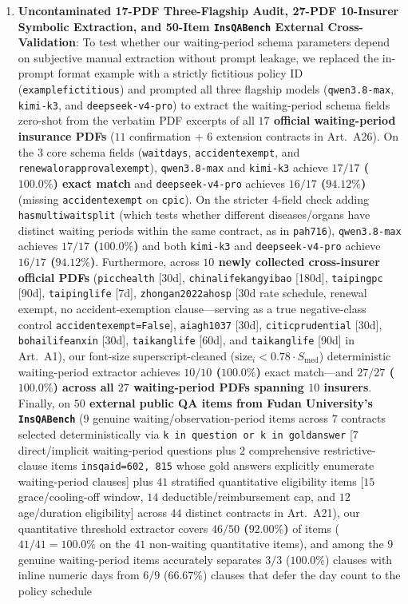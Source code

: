 \documentclass[10pt,twocolumn]{article}
\renewcommand{\_}{\textunderscore\allowbreak}
\begin{document}
\begin{enumerate}[leftmargin=*,nosep]
  \item \textbf{Uncontaminated 17-PDF Three-Flagship Audit, 27-PDF 10-Insurer Symbolic Extraction, and 50-Item \texttt{InsQABench} External Cross-Validation}: To test whether our waiting-period schema parameters depend on subjective manual extraction without prompt leakage, we replaced the in-prompt format example with a strictly fictitious policy ID (\texttt{example\_fictitious\_000}) and prompted all three flagship models (\texttt{qwen3.8-max}, \texttt{kimi-k3}, and \texttt{deepseek-v4-pro}) to extract the waiting-period schema fields zero-shot from the verbatim PDF excerpts of all \textbf{$17$ official waiting-period insurance PDFs} ($11$ confirmation + $6$ extension contracts in Art.~A26). On the 3 core schema fields (\texttt{wait\_days}, \texttt{accident\_exempt}, and \texttt{renewal\_or\_approval\_exempt}), \texttt{qwen3.8-max} and \texttt{kimi-k3} achieve \textbf{$17/17$ ($100.0\%$) exact match} and \texttt{deepseek-v4-pro} achieves \textbf{$16/17$ ($94.12\%$)} (missing \texttt{accident\_exempt} on \texttt{cpic\_85050}). On the stricter 4-field check adding \texttt{has\_multi\_wait\_split} (which tests whether different diseases/organs have distinct waiting periods within the same contract, as in \texttt{pa\_h716}), \texttt{qwen3.8-max} achieves \textbf{$17/17$ ($100.0\%$)} and both \texttt{kimi-k3} and \texttt{deepseek-v4-pro} achieve \textbf{$16/17$ ($94.12\%$)}. Furthermore, across \textbf{$10$ newly collected cross-insurer official PDFs} (\texttt{picc\_health\_9100015834} [30d], \texttt{chinalife\_kangyibao} [180d], \texttt{taiping\_pc\_202608} [90d], \texttt{taiping\_life\_202411} [7d], \texttt{zhongan\_2022a\_hosp} [30d rate schedule, renewal exempt, no accident-exemption clause---serving as a true negative-class control \texttt{accident\_exempt=False}], \texttt{aia\_gh1037\_01} [30d], \texttt{citic\_prudential\_016} [30d], \texttt{bohai\_life\_anxin} [30d], \texttt{taikang\_life\_202601} [60d], and \texttt{taikang\_life\_2021\_037} [90d] in Art.~A1), our font-size superscript-cleaned ($\text{size}_i < 0.78 \cdot S_{\text{med}}$) deterministic waiting-period extractor achieves \textbf{$10/10$ ($100.0\%$)} exact match---and \textbf{$27/27$ ($100.0\%$) across all $27$ waiting-period PDFs spanning $10$ insurers}. Finally, on \textbf{$50$ external public QA items from Fudan University's \texttt{InsQABench}} ($9$ genuine waiting/observation-period items across $7$ contracts selected deterministically via \texttt{k in question or k in gold\_answer} [$7$ direct/implicit waiting-period questions plus $2$ comprehensive restrictive-clause items \texttt{insqa\_id=602, 815} whose gold answers explicitly enumerate waiting-period clauses] plus $41$ stratified quantitative eligibility items [$15$ grace/cooling-off window, $14$ deductible/reimbursement cap, and $12$ age/duration eligibility] across $44$ distinct contracts in Art.~A21), our quantitative threshold extractor covers \textbf{$46/50$ ($92.00\%$)} of items ($41/41 = 100.0\%$ on the $41$ non-waiting quantitative items), and among the $9$ genuine waiting-period items accurately separates $3/3$ ($100.0\%$) clauses with inline numeric days from $6/9$ ($66.67\%$) clauses that defer the day count to the policy schedule 
\end{enumerate}
\end{document}

